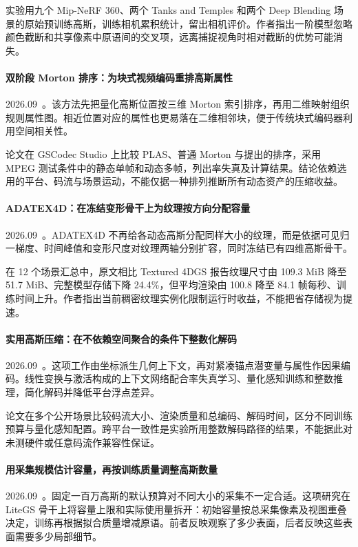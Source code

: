 实验用九个 Mip-NeRF 360、两个 Tanks and Temples 和两个 Deep Blending 场景的原始预训练高斯，训练相机累积统计，留出相机评价。作者指出一阶模型忽略颜色截断和共享像素中原语间的交叉项，远离捕捉视角时相对截断的优势可能消失。

\paragraph{双阶段 Morton 排序：为块式视频编码重排高斯属性}
2026.09~\cite{2609_29041}。该方法先把量化高斯位置按三维 Morton 索引排序，再用二维映射组织规则属性图。相近位置对应的属性也更易落在二维相邻块，便于传统块式编码器利用空间相关性。

论文在 GSCodec Studio 上比较 PLAS、普通 Morton 与提出的排序，采用 MPEG 测试条件中的静态单帧和动态多帧，列出率失真及计算结果。结论依赖选用的平台、码流与场景运动，不能仅据一种排列推断所有动态资产的压缩收益。

\paragraph{ADATEX4D：在冻结变形骨干上为纹理按方向分配容量}
2026.09~\cite{2609_29963}。ADATEX4D 不再给各动态高斯分配同样大小的纹理，而是依据可见归一梯度、时间峰值和变形尺度对纹理两轴分别扩容，同时冻结已有四维高斯骨干。

在 12 个场景汇总中，原文相比 Textured 4DGS 报告纹理尺寸由 109.3 MiB 降至 51.7 MiB、完整模型存储下降 24.4\%，但平均渲染由 100.8 降至 84.1 帧每秒、训练时间上升。作者指出当前稠密纹理实例化限制运行时收益，不能把省存储视为提速。

\paragraph{实用高斯压缩：在不依赖空间聚合的条件下整数化解码}
2026.09~\cite{2609_30245}。这项工作由坐标派生几何上下文，再对紧凑锚点潜变量与属性作因果编码。线性变换与激活构成的上下文网络配合率失真学习、量化感知训练和整数推理，简化解码并降低平台浮点差异。

论文在多个公开场景比较码流大小、渲染质量和总编码、解码时间，区分不同训练预算与量化感知配置。跨平台一致性是实验所用整数解码路径的结果，不能据此对未测硬件或任意码流作兼容性保证。

\paragraph{用采集规模估计容量，再按训练质量调整高斯数量}
2026.09~\cite{2609_31248}。固定一百万高斯的默认预算对不同大小的采集不一定合适。这项研究在 LiteGS 骨干上将容量上限和实际使用量拆开：初始容量按总采集像素及视图重叠决定，训练再根据拟合质量增减原语。前者反映观察了多少表面，后者反映这些表面需要多少局部细节。

